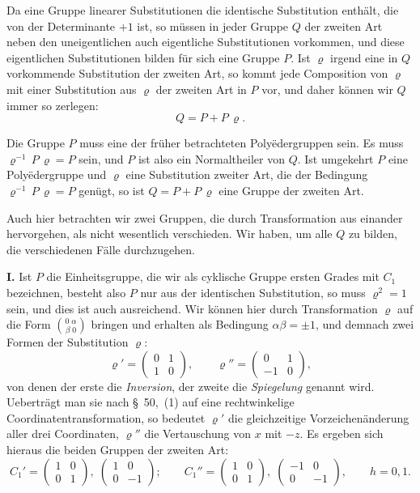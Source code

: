 \documentclass[12pt,a4paper]{article}
\begin{document}
Da eine Gruppe linearer Substitutionen die identische Substitution enthält, die von der Determinante $+1$ ist, so müssen in jeder Gruppe $Q$ der zweiten Art neben den uneigentlichen auch eigentliche Substitutionen vorkommen, und diese eigentlichen Substitutionen bilden für sich eine Gruppe $P$. Ist $\varrho$ irgend eine in $Q$ vorkommende Substitution der zweiten Art, so kommt jede Composition von $\varrho$ mit einer Substitution aus $\varrho$ der zweiten Art in $P$ vor, und daher können wir $Q$ immer so zerlegen:
\begin{equation}\label{eq:62.1}
\tag{1}
Q = P + P\,\varrho.
\end{equation}

Die Gruppe $P$ muss eine der früher betrachteten Polyëdergruppen sein. Es muss $\varrho^{-1}\,P\,\varrho = P$ sein, und $P$ ist also ein Normaltheiler von $Q$. Ist umgekehrt $P$ eine Polyëdergruppe und $\varrho$ eine Substitution zweiter Art, die der Bedingung $\varrho^{-1}\,P\,\varrho = P$ genügt, so ist $Q = P + P\,\varrho$ eine Gruppe der zweiten Art.

Auch hier betrachten wir zwei Gruppen, die durch Transformation aus einander hervorgehen, als nicht wesentlich verschieden. Wir haben, um alle $Q$ zu bilden, die verschiedenen Fälle durchzugehen.

\medskip\noindent
\textbf{I.} Ist $P$ die Einheitsgruppe, die wir als cyklische Gruppe ersten Grades mit $C_{1}$ bezeichnen, besteht also $P$ nur aus der identischen Substitution, so muss $\varrho^{2} = 1$ sein, und dies ist auch ausreichend. Wir können hier durch Transformation $\varrho$ auf die Form $\binom{0\;\alpha}{\beta\;0}$ bringen und erhalten als Bedingung $\alpha\beta = \pm 1$, und demnach zwei Formen der Substitution $\varrho$:
\[
\varrho' = \begin{pmatrix}0&1\\1&0\end{pmatrix},\qquad
\varrho'' = \begin{pmatrix}0&1\\-1&0\end{pmatrix},
\]
von denen der erste die \emph{Inversion}, der zweite die \emph{Spiegelung} genannt wird. Ueberträgt man sie nach \S~50,~(1) auf eine rechtwinkelige Coordinatentransformation, so bedeutet $\varrho'$ die gleichzeitige Vorzeichenänderung aller drei Coordinaten, $\varrho''$ die Vertauschung von $x$ mit $-z$. Es ergeben sich hieraus die beiden Gruppen der zweiten Art:
\begin{equation}\label{eq:62.2}
\tag{2}
C_{1}' = \begin{pmatrix}1&0\\0&1\end{pmatrix},\;
\begin{pmatrix}1&0\\0&-1\end{pmatrix};\qquad
C_{1}'' = \begin{pmatrix}1&0\\0&1\end{pmatrix},\;
\begin{pmatrix}-1&0\\0&-1\end{pmatrix},\qquad h = 0,1.
\end{equation}
\end{document}
